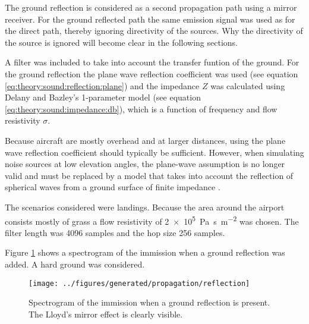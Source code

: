The ground reflection is considered as a second propagation path using a mirror receiver.
For the ground reflected path the same emission signal was used as for the
direct path, thereby ignoring directivity of the sources. Why the directivity of
the source is ignored will become clear in the following sections.

A filter was included to take into account the transfer funtion of the ground.
For the ground reflection the plane wave reflection coefficient was used (see
equation \ref{eq:theory:sound:reflection:plane}) and the impedance $Z$ was
calculated using Delany and Bazley's 1-parameter model (see equation
\ref{eq:theory:sound:impedance:db}), which is a function of frequency and flow
resistivity $\sigma$.

Because aircraft are mostly overhead and at larger distances,
using the plane wave reflection coefficient should typically be sufficient.
However, when simulating noise sources at low elevation angles, the plane-wave
assumption is no longer valid and must be replaced by a model that takes into
account the reflection of spherical waves from a ground surface of finite
impedance \cite{Tuttle2014}.

The scenarios considered were landings. Because the area around the airport
consists mostly of grass a flow resistivity of
\SI{2e5}{\pascal\second\per\meter\squared} was chosen. The filter length was
4096 samples and the hop size 256 samples.

Figure \ref{fig:implementation:propagation:reflection} shows a spectrogram of
the immission when a ground reflection was added. A hard ground was considered.

\begin{figure}[H]
  \centering
  \texttt{[image: ../figures/generated/propagation/reflection]}
  \caption{Spectrogram of the immission when a ground reflection is present. The Lloyd's mirror effect is clearly visible.}
  \label{fig:implementation:propagation:reflection}
\end{figure}


